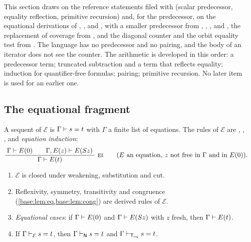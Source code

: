 This section draws on the reference statements filed with
 (scalar predecessor, equality reflection, primitive
recursion) and, for the predecessor, on the equational derivations of
, ,  and
, with a smaller predecessor from ,
, ,  and
, the replacement of coverage from ,
and the diagonal counter and the orbit equality test from
.  The language
has no predecessor and no pairing, and the
body of an iterator does not see the counter.  The arithmetic is developed
in this order: a
predecessor term; truncated subtraction and a term that reflects equality;
induction for quantifier-free formulas; pairing; primitive recursion.  No
later item is used for an earlier one.

\subsection{The equational fragment}

\begin{definition}
\label{base:def:E}
A sequent of $\mathcal E$ is $\Gamma\vdash s=t$ with $\Gamma$ a finite list
of equations.  The rules of $\mathcal E$ are , ,
,  and \emph{equation induction}:
\[
 \infrule{\Gamma\proves E(0)\qquad\Gamma,E(z)\proves E(\Suc z)}
         {\Gamma\proves E(t)}\ \rulename{EI}
 \qquad(\text{$E$ an equation, $z$ not free in $\Gamma$ and in $E(0)$}).
\]
\end{definition}

\begin{lemma}
\label{base:lem:E}
\begin{enumerate}[label=\textup{(\roman*)}]
\item $\mathcal E$ is closed under weakening, substitution and cut.
\item Reflexivity, symmetry, transitivity and congruence
 (\cref{base:lem:eq,base:lem:cong}) are derived rules of $\mathcal E$.
\item \emph{Equational cases}: if $\Gamma\vdash E(0)$ and
 $\Gamma\vdash E(S z)$ with $z$ fresh, then $\Gamma\vdash E(t)$.
\item If $\Gamma\vdash_{\mathcal E}s=t$, then $\Gamma\vdash_{\mathsf{N}}s=t$ and
 $\Gamma\vdash_{\mathsf{T}_{\mathrm{eq}}}s=t$.
\end{enumerate}
\end{lemma}

